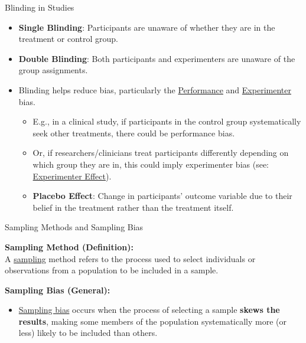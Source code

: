 \documentclass[handout]{beamer} %
\begin{document}
\begin{frame}{Blinding in Studies}
    \begin{itemize}
        \item \textbf{Single Blinding}: Participants are unaware of whether they are in the treatment or control group.
        \item \textbf{Double Blinding}: Both participants and experimenters are unaware of the group assignments. \pause %
        \item Blinding helps reduce bias, particularly the \href{https://catalogofbias.org/biases/performance-bias/}{Performance} and \href{https://dictionary.apa.org/experimenter-bias}{Experimenter} bias. \pause %
        \begin{itemize}
        \item E.g., in a clinical study, if participants in the control group systematically seek other treatments, there could be performance bias.
        \item Or, if researchers/clinicians treat participants differently depending on which group they are in, this could imply experimenter bias (see: \href{https://dictionary.apa.org/experimenter-effect}{Experimenter Effect}).
        \item  \textbf{Placebo Effect}: Change in participants' outcome variable due to their belief in the treatment rather than the treatment itself.
        \end{itemize}
    \end{itemize}
\end{frame}


\begin{frame}{Sampling Methods and Sampling Bias}

    \textbf{Sampling Method (Definition):} \\
    A \href{https://dictionary.apa.org/sampling}{sampling} method refers to the process used to select individuals or observations from a population to be included in a sample.
    \newline

    \textbf{Sampling Bias (General):}
    \begin{itemize}
        \item
        \href{https://dictionary.apa.org/sampling-bias}{Sampling bias} occurs when the process of selecting a sample \textbf{skews the results}, making some members of the population systematically more (or less) likely to be included than others.
    \end{itemize}

\end{frame}
\end{document}
